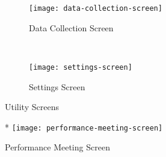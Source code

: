 \begin{figure*}[ht]
    \centering
    \begin{subfigure}[t]{0.4\textwidth}
        \centering
        \texttt{[image: data-collection-screen]}
        \caption{Data Collection Screen}
    \end{subfigure}%
    ~ 
    \begin{subfigure}[t]{0.4\textwidth}
        \centering
        \texttt{[image: settings-screen]}
        \caption{Settings Screen}
    \end{subfigure}
    \caption{Utility Screens}
\end{figure*}

\begin{figure}*
    \centering
    \texttt{[image: performance-meeting-screen]}
    \caption{Performance Meeting Screen}
    \label{fig:performance-meeting-screen}
\end{figure}